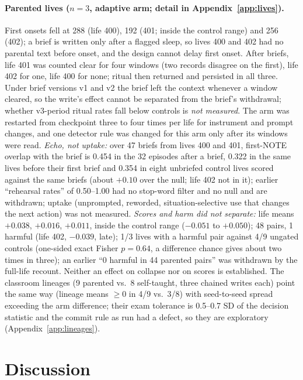 \documentclass{article}
\newcommand{\nm}{\emph{not measured}}
\begin{document}
\paragraph{Parented lives ($n = 3$, adaptive arm; detail in Appendix~\ref{app:lives}).} First onsets fell at 288 (life 400), 192 (401; inside the control range) and 256 (402); a brief is written only after a flagged sleep, so lives 400 and 402 had no parental text before onset, and the design cannot delay first onset. After briefs, life 401 was counted clear for four windows (two records disagree on the first), life 402 for one, life 400 for none; ritual then returned and persisted in all three. Under brief versions v1 and v2 the brief left the context whenever a window cleared, so the write's effect cannot be separated from the brief's withdrawal; whether v3-period ritual rates fall below controls is \nm. The arm was restarted from checkpoint three to four times per life for instrument and prompt changes, and one detector rule was changed for this arm only after its windows were read. \emph{Echo, not uptake:} over 47 briefs from lives 400 and 401, first-NOTE overlap with the brief is 0.454 in the 32 episodes after a brief, 0.322 in the same lives before their first brief and 0.354 in eight unbriefed control lives scored against the same briefs (about $+0.10$ over the null; life 402 not in it); earlier ``rehearsal rates'' of 0.50--1.00 had no stop-word filter and no null and are withdrawn; uptake (unprompted, reworded, situation-selective use that changes the next action) was not measured. \emph{Scores and harm did not separate:} life means $+0.038$, $+0.016$, $+0.011$, inside the control range ($-0.051$ to $+0.050$); 48 pairs, 1 harmful (life 402, $-0.039$, late); 1/3 lives with a harmful pair against 4/9 ungated controls (one-sided exact Fisher $p = 0.64$, a difference chance gives about two times in three); an earlier ``0 harmful in 44 parented pairs'' was withdrawn by the full-life recount. Neither an effect on collapse nor on scores is established. The classroom lineages (9 parented vs.\ 8 self-taught, three chained writes each) point the same way (lineage means $\ge 0$ in 4/9 vs.\ 3/8) with seed-to-seed spread exceeding the arm difference; their exam tolerance is 0.5--0.7 SD of the decision statistic and the commit rule as run had a defect, so they are exploratory (Appendix~\ref{app:lineages}).

\section{Discussion}
\label{sec:discussion}
\end{document}

